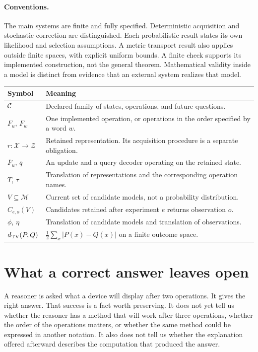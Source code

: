 \documentclass[11pt,letterpaper]{article}
\theoremstyle{plain}
\theoremstyle{definition}
\newcommand{\X}{\mathcal X}\newcommand{\Z}{\mathcal Z}
\newcommand{\M}{\mathcal M}\newcommand{\E}{\mathbb E}
\begin{document}
\paragraph{Conventions.}
The main systems are finite and fully specified. Deterministic acquisition and stochastic correction are distinguished. Each probabilistic result states its own likelihood and selection assumptions. A metric transport result also applies outside finite spaces, with explicit uniform bounds. A finite check supports its implemented construction, not the general theorem. Mathematical validity inside a model is distinct from evidence that an external system realizes that model.

\begin{center}\small
\begin{tabularx}{\textwidth}{@{}lX@{}}\toprule
Symbol & Meaning\\\midrule
$\mathcal C$ & Declared family of states, operations, and future questions.\\
$F_u$, $F_w$ & One implemented operation, or operations in the order specified by a word $w$.\\
$r:\X\to\Z$ & Retained representation. Its acquisition procedure is a separate obligation.\\
$\bar F_u$, $\bar q$ & An update and a query decoder operating on the retained state.\\
$T$, $\tau$ & Translation of representations and the corresponding operation names.\\
$V\subseteq\M$ & Current set of candidate models, not a probability distribution.\\
$C_{e,o}(V)$ & Candidates retained after experiment $e$ returns observation $o$.\\
$\phi$, $\eta$ & Translation of candidate models and translation of observations.\\
$d_{\mathrm{TV}}(P,Q)$ & $\tfrac12\sum_x|P(x)-Q(x)|$ on a finite outcome space.\\\bottomrule
\end{tabularx}\end{center}
\clearpage{}

\section{What a correct answer leaves open}\label{sec:intro}
A reasoner is asked what a device will display after two operations. It gives the right answer. That success is a fact worth preserving. It does not yet tell us whether the reasoner has a method that will work after three operations, whether the order of the operations matters, or whether the same method could be expressed in another notation. It also does not tell us whether the explanation offered afterward describes the computation that produced the answer.
\end{document}

